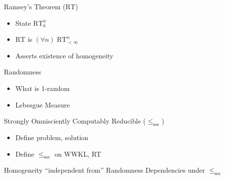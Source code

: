 \begin{frame}{Ramsey's Theorem ($\text{RT}$)}
  \begin{itemize}
    \item State $\text{RT}_k^n$
    \item $\text{RT}$ is $(\forall n)\; \text{RT}_{<\infty}^n$
  \end{itemize}

  \begin{itemize}
    \item Asserts existence of homogeneity
  \end{itemize}
\end{frame}

\begin{frame}{Randomness}
  \begin{itemize}
    \item What is 1-random
    \item Lebesgue Measure
  \end{itemize}
\end{frame}

\begin{frame}{Strongly Omnisciently Computably Reducible
  ($\leq_{\text{soc}}$)}
  \begin{itemize}
    \item Define problem, solution
    \item Define $\leq_{\text{soc}}$ on WWKL, RT
  \end{itemize}
\end{frame}


\begin{frame}{Homogeneity ``independent from'' Randomness}
  Dependencies under $\leq_{\text{soc}}$
  \vspace{2em}

  \begin{center}
  \end{center}
\end{frame}

